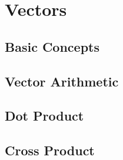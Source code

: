 \documentclass[../satmath.tex]{subfiles}
\begin{document}
\chapter{Vectors}
\section{Basic Concepts}
\section{Vector Arithmetic}
\section{Dot Product}
\section{Cross Product}
\end{document}
